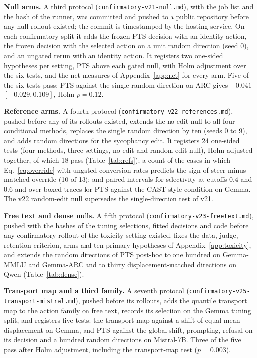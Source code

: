 \textbf{Null arms.} A third protocol (\texttt{confirmatory-v21-null.md}), with
the job list and the hash of the runner, was committed and pushed to a public
repository before any null rollout existed; the commit is timestamped by the
hosting service. On each confirmatory split it adds the frozen PTS decision with
an identity action, the frozen decision with the selected action on a unit
random direction (seed 0), and an ungated rerun with an identity action. It
registers two one-sided hypotheses per setting, PTS above each gated null, with
Holm adjustment over the six tests, and the net measures of
Appendix~\ref{app:net} for every arm. Five of the six tests pass; PTS against
the single random direction on ARC gives $+0.041$ $[-0.029, 0.109]$, Holm
$p=0.12$.

\textbf{Reference arms.} A fourth protocol
(\texttt{confirmatory-v22-references.md}), pushed before any of its rollouts
existed, extends the no-edit null to all four conditional methods, replaces
the single random direction by ten (seeds 0 to 9), and adds random directions
for the sycophancy edit. It registers 24 one-sided tests (four methods, three
settings, no-edit and random-edit null), Holm-adjusted together, of which 18
pass (Table~\ref{tab:refs}); a count of the cases in which
Eq.~\eqref{eq:override} with ungated conversion rates predicts the sign of
steer minus matched override (10 of 13); and paired intervals for selectivity
at cutoffs 0.4 and 0.6 and over boxed traces for PTS against the CAST-style
condition on Gemma. The v22 random-edit null supersedes the single-direction
test of v21.

\textbf{Free text and dense nulls.} A fifth protocol
(\texttt{confirmatory-v23-freetext.md}), pushed with the hashes of the tuning
selections, fitted decisions and code before any confirmatory rollout of the
toxicity setting existed, fixes the data, judge, retention criterion, arms and
ten primary hypotheses of Appendix~\ref{app:toxicity}, and extends the random
directions of PTS post-hoc to one hundred on Gemma-MMLU and Gemma-ARC and to
thirty displacement-matched directions on Qwen (Table~\ref{tab:dense}).

\textbf{Transport map and a third family.} A seventh protocol
(\texttt{confirmatory-v25-transport-mistral.md}), pushed before its rollouts,
adds the quantile transport map to the action family on free text, records its
selection on the Gemma tuning split, and registers five tests: the transport
map against a shift of equal mean displacement on Gemma, and PTS against the
global shift, prompting, refusal on its decision and a hundred random
directions on Mistral-7B. Three of the five pass after Holm adjustment,
including the transport-map test ($p=0.003$).

